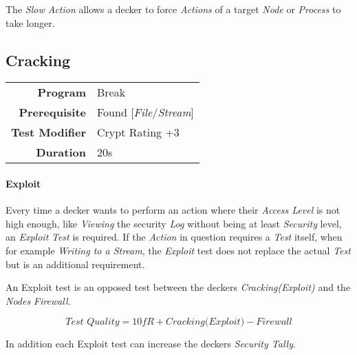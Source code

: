 \hfill

The \emph{Slow Action} allows a decker to force \emph{Actions} of a target
\emph{Node} or \emph{Process} to take
longer.

\subsection{Cracking}

\label{par:break}

\begin{tabular}{rl}
    \textbf{Program}       & Break                             \\
    \textbf{Prerequisite}  & Found [\emph{File}/\emph{Stream}] \\
    \textbf{Test Modifier} & Crypt Rating +3                   \\
    \textbf{Duration}      & 20s                               \\
\end{tabular}

\hfill

\paragraph{Exploit}

Every time a decker wants to perform an action where their \emph{Access Level}
is not high enough, like \emph{Viewing} the security \emph{Log} without being
at least \emph{Security} level, an \emph{Exploit} \emph{Test} is required.
If the \emph{Action} in question requires a \emph{Test} itself,
when for example \emph{Writing to a Stream}, the \emph{Exploit} test does not
replace the actual \emph{Test} but is an additional requirement.

An Exploit test is an opposed test between the deckers \emph{Cracking(Exploit)} and
the \emph{Nodes} \emph{Firewall}.

\begin{equation*}
    \textit{Test Quality} = \textit{10fR} + \textit{Cracking(Exploit)} - \textit{Firewall}
\end{equation*}

In addition each Exploit test can increase the deckers \emph{Security Tally}.



